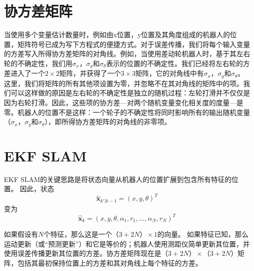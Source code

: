 \section{协方差矩阵}

当使用多个变量估计数量时，例如由x位置，y位置及其角度组成的机器人的位置，矩阵符号已成为写下方程式的便捷方式。对于误差传播，我们将每个输入变量的方差写入所得协方差矩阵的对角线。例如，当使用差动轮机器人时，基于其左右轮的不确定性，我们用$\sigma_x$，$\sigma_y $和$\sigma_{\theta}$表示的位置的不确定性。我们已经将左右轮的方差进入了一个$2\times2$矩阵，并获得了一个$3\times3$矩阵，它的对角线中有$\sigma_x$，$\sigma_y$和$\sigma_{\theta}$。这里，我们将矩阵的所有其他项设置为零，并忽略不在其对角线的矩阵中的项。我们可以这样做的原因是左右轮的不确定性是独立的随机过程：左轮打滑并不仅仅是因为右轮打滑。因此，这些项的协方差---对两个随机变量变化相关度的度量---是零。机器人的位置不是这样：一个轮子的不确定性将同时影响所有的输出随机变量（$\sigma_x$，$\sigma_y $和$\sigma_{\theta}$），即所得协方差矩阵的对角线的非零项。

\section{EKF SLAM}\label{sec:ekfslam}\label{sec:ekf}
EKF SLAM的关键思路是将状态向量从机器人的位置扩展到包含所有特征的位置。 因此，状态
\begin{equation}
\hat{\boldsymbol{x}}_{k'|k-1}=(x,y,\theta)^T
\end{equation}
变为
\begin{equation}
\hat{\boldsymbol{x}}_{k}=(x,y,\theta,\alpha_1,r_1,\ldots,\alpha_N,r_N)^T
\end{equation}


如果假设有$ N $个特征，那么这是一个$（3+2N） \times 1 $的向量。 如果特征已知，那么运动更新（或“预测更新”）和它是等价的；机器人使用测距仪简单更新其位置，并使用误差传播更新其位置的方差。协方差矩阵现在是$（3 + 2N）\times（3 + 2N）$矩阵，包括其最初保持位置上的方差和其对角线上每个特征的方差。

